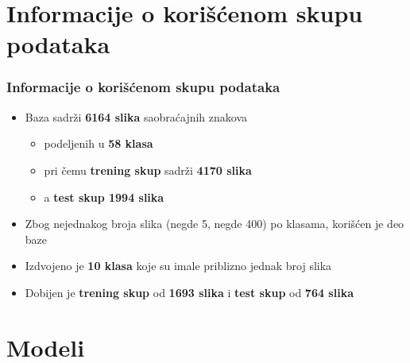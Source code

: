 \documentclass{beamer}
\begin{document}
\section{Informacije o korišćenom skupu podataka}
\begin{frame}
\frametitle{Informacije o korišćenom skupu podataka}

\begin{itemize}
\item Baza sadrži \textbf{6164 slika} saobraćajnih znakova
\begin{itemize}
\item podeljenih u \textbf{58 klasa}
\item pri čemu \textbf{trening skup} sadrži \textbf{4170 slika}
\item a \textbf{test skup 1994 slika}
\end{itemize}
\item Zbog nejednakog broja slika (negde 5, negde 400) po klasama, korišćen je deo baze
\item Izdvojeno je \textbf{10 klasa} koje su imale priblizno jednak broj slika
\item Dobijen je \textbf{trening skup} od \textbf{1693 slika} i \textbf{test skup} od \textbf{764 slika}



\end{itemize}

\end{frame}

\section{Modeli}
\end{document}
